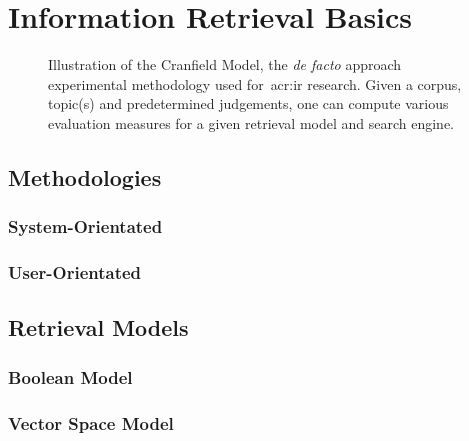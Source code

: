 \section{Information Retrieval Basics}\label{sec:ir_background:basics}

\begin{figure}[t!]
    \centering
    \caption[The \emph{Cranfield Model}]{Illustration of the Cranfield Model, the \emph{de facto} approach experimental methodology used for~\gls{acr:ir} research. Given a corpus, topic(s) and predetermined judgements, one can compute various evaluation measures for a given retrieval model and search engine.}
    \label{fig:ir_cranfield}
\end{figure}

\subsection{Methodologies}

\subsubsection{System-Orientated}

\subsubsection{User-Orientated}

\subsection{Retrieval Models}

\subsubsection{Boolean Model}

\subsubsection{Vector Space Model}

